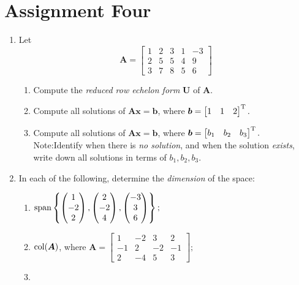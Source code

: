 \section{Assignment Four}
\begin{enumerate}
\item
Let
\[
\bm A=\begin{bmatrix}
1&2&3&1&-3\\2&5&5&4&9\\3&7&8&5&6
\end{bmatrix}
\]
\begin{enumerate}
\item
Compute the \textit{reduced row echelon form} $\bm U$ of $\bm A$.
\item
Compute all solutions of $\bm{Ax}=\bm b$, where $\bm b=\begin{bmatrix}
1&1&2
\end{bmatrix}^{\mathrm T}.$
\item
Compute all solutions of $\bm{Ax}=\bm b$, where $\bm b=\begin{bmatrix}
b_1&b_2&b_3
\end{bmatrix}^{\mathrm T}.$\\
Note:Identify when there is \textit{no solution}, and when the solution \textit{exists}, write down all solutions in terms of $b_1,b_2,b_3$.
\end{enumerate}
\item
In each of the following, determine the \textit{dimension} of the space:
\begin{enumerate}
\item
$\operatorname{span}\left\{
\begin{pmatrix}
1\\-2\\2
\end{pmatrix},\begin{pmatrix}
2\\-2\\4
\end{pmatrix},\begin{pmatrix}
-3\\3\\6
\end{pmatrix}
\right\};$
\item
$\operatorname{col}(\bm A)$, where $\bm A=\begin{bmatrix}
1&-2&3&2\\-1&2&-2&-1\\2&-4&5&3
\end{bmatrix};$
\item

\end{enumerate}
\end{enumerate}

